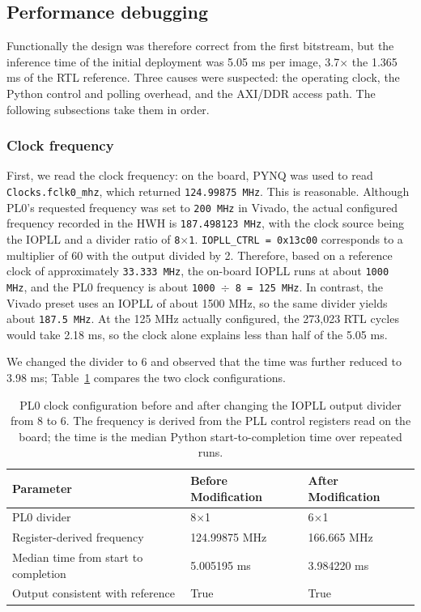 \subsection{Performance debugging}\label{sec:5.3}

Functionally the design was therefore correct from the first bitstream, but the inference time of the initial deployment was 5.05 ms per image, 3.7$\times$ the 1.365 ms of the RTL reference. Three causes were suspected: the operating clock, the Python control and polling overhead, and the AXI/DDR access path. The following subsections take them in order.

\subsubsection{Clock frequency}\label{sec:5.3.1}

First, we read the clock frequency: on the board, PYNQ was used to read \texttt{Clocks.fclk0\_mhz}, which returned \texttt{124.99875 MHz}. This is reasonable. Although PL0's requested frequency was set to \texttt{200 MHz} in Vivado, the actual configured frequency recorded in the HWH is \texttt{187.498123 MHz}, with the clock source being the IOPLL and a divider ratio of \texttt{8$\times$1}. \texttt{IOPLL\_CTRL = 0x13c00} corresponds to a multiplier of 60 with the output divided by 2. Therefore, based on a reference clock of approximately \texttt{33.333 MHz}, the on-board IOPLL runs at about \texttt{1000 MHz}, and the PL0 frequency is about \texttt{1000 $\div$ 8 = 125 MHz}. In contrast, the Vivado preset uses an IOPLL of about 1500 MHz, so the same divider yields about \texttt{187.5 MHz}. At the 125 MHz actually configured, the 273,023 RTL cycles would take 2.18 ms, so the clock alone explains less than half of the 5.05 ms.

We changed the divider to 6 and observed that the time was further reduced to 3.98 ms; Table~\ref{tab:14} compares the two clock configurations.

\begin{table}[!htbp]
\centering
\footnotesize
\caption{PL0 clock configuration before and after changing the IOPLL output divider from 8 to 6. The frequency is derived from the PLL control registers read on the board; the time is the median Python start-to-completion time over repeated runs.}
\label{tab:14}
\begin{tabular}{lll}
\toprule
Parameter & Before Modification & After Modification \\
\midrule
PL0 divider & 8$\times$1 & 6$\times$1 \\
Register-derived frequency & 124.99875 MHz & 166.665 MHz \\
Median time from start to completion & 5.005195 ms & 3.984220 ms \\
Output consistent with reference & True & True \\
\bottomrule
\end{tabular}
\end{table}

